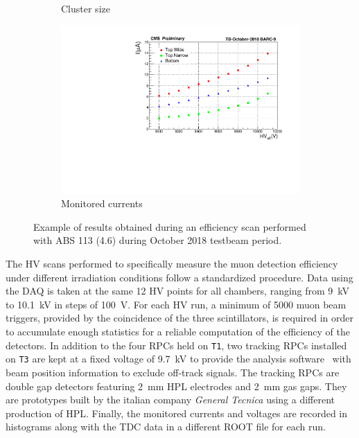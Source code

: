 \begin{figure}
\begin{subfigure}{\linewidth}
			\caption{\label{fig:efficiency-scan:B} Cluster size}
		\end{subfigure}
		\begin{subfigure}{\linewidth}
			\centering
			\includegraphics[width = \linewidth]{fig/chapt5/HV-Scan-Currents.pdf}
			\caption{\label{fig:efficiency-scan:C} Monitored currents}
		\end{subfigure}
		\caption{\label{fig:efficiency-scan} Example of results obtained during an efficiency scan performed with ABS 113 (4.6) during October 2018 testbeam period.}
	\end{figure}
	
	The HV scans performed to specifically measure the muon detection efficiency under different irradiation conditions follow a standardized procedure. Data using the DAQ is taken at the same 12 HV points for all chambers, ranging from \SI{9}{kV} to \SI{10.1}{kV} in steps of \SI{100}{V}. For each HV run, a minimum of 5000 muon beam triggers, provided by the coincidence of the three scintillators, is required in order to accumulate enough statistics for a reliable computation of the efficiency of the detectors. In addition to the four RPCs held on \texttt{T1}, two tracking RPCs installed on \texttt{T3} are kept at a fixed voltage of \SI{9,7}{kV} to provide the analysis software~\cite{GIFOffline} with beam position information to exclude off-track signals. The tracking RPCs are double gap detectors featuring \SI{2}{mm} HPL electrodes and \SI{2}{mm} gas gaps. They are prototypes built by the italian company \textit{General Tecnica} using a different production of HPL. Finally, the monitored currents and voltages are recorded in histograms along with the TDC data in a different ROOT file for each run.
	
